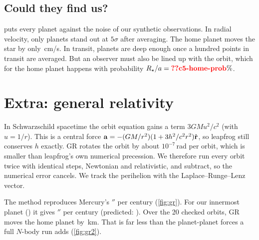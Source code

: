 \documentclass[aps,prd,twocolumn,nofootinbib,floatfix,superscriptaddress]{revtex4-2}
\begin{document}
\subsection{Could they find us?}
 puts every planet against the noise of our synthetic observations.
In radial velocity, only planets  stand out at $5\sigma$ after averaging.
The home planet moves the star by only \,cm/s.
In transit, planets  are deep enough once a hundred points in transit are averaged.
But an observer must also be lined up with the orbit, which for the home planet happens with probability $R_\star/a=\val{c5-home-prob}\%$.


\section{Extra: general relativity}
In Schwarzschild spacetime the orbit equation gains a term $3GMu^2/c^2$ (with $u=1/r$).
This is a central force $\mathbf{a}=-(GM/r^2)(1+3h^2/c^2r^2)\hat{\mathbf{r}}$, so leapfrog still conserves $h$ exactly.
GR rotates the orbit by about $10^{-7}$\,rad per orbit, which is smaller than leapfrog's own numerical precession.
We therefore run every orbit twice with identical steps, Newtonian and relativistic, and subtract, so the numerical error cancels.
We track the perihelion with the Laplace--Runge--Lenz vector.

The method reproduces Mercury's $''$ per century (\cref{fig:gr}).
For our innermost planet () it gives $''$ per century (predicted: ).
Over the 20 checked orbits, GR moves the home planet by \,km.
That is far less than the planet-planet forces a full $N$-body run adds (\cref{fig:gr2}).
\end{document}
